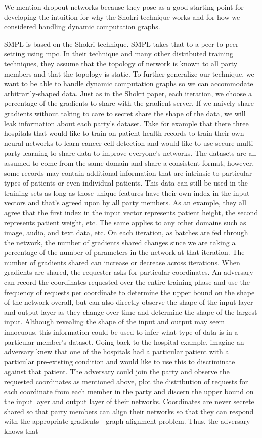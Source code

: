 We mention dropout networks because they pose as a good starting point for developing the intuition for why the Shokri technique works and for how we considered handling dynamic computation graphs.

SMPL is based on the Shokri technique. SMPL takes that to a peer-to-peer setting using mpc. In their technique and many other distributed training techniques, they assume that the topology of network is known to all party members and that the topology is static. To further generalize our technique, we want to be able to handle dynamic computation graphs so we can accommodate arbitrarily-shaped data. Just as in the Shokri paper, each iteration, we choose a percentage of the gradients to share with the gradient server.  If we naively share gradients without taking to care to secret share the shape of the data, we will leak information about each party’s dataset. Take for example that there three hospitals that would like to train on patient health records to train their own neural networks to learn cancer cell detection and would like to use secure multi-party learning to share data to improve everyone’s networks. The datasets are all assumed to come from the same domain and share a consistent format, however, some records may contain additional information that are intrinsic to particular types of patients or even individual patients. This data can still be used in the training sets as long as those unique features have their own index in the input vectors and that’s agreed upon by all party members. As an example, they all agree that the first index in the input vector represents patient height, the second represents patient weight, etc. The same applies to any other domains such as image, audio, and text data, etc. On each iteration, as batches are fed through the network, the number of gradients shared changes since we are taking a percentage of the number of parameters in the network at that iteration. The number of gradients shared can increase or decrease across iterations. When gradients are shared, the requester asks for particular coordinates. An adversary can record the coordinates requested over the entire training phase and use the frequency of requests per coordinate to determine the upper bound on the shape of the network overall, but can also directly observe the shape of the input layer and output layer as they change over time and determine the shape of the largest input. Although revealing the shape of the input and output may seem innocuous, this information could be used to infer what type of data is in a particular member’s dataset. Going back to the hospital example, imagine an adversary knew that one of the hospitals had a particular patient with a particular pre-existing condition and would like to use this to discriminate against that patient. The adversary could join the party and observe the requested coordinates as mentioned above, plot the distribution of requests for each coordinate from each member in the party and discern the upper bound on the input layer and output layer of their networks. Coordinates are never secrete shared so that party members can align their networks so that they can respond with the appropriate gradients - graph alignment problem. Thus, the adversary knows that 